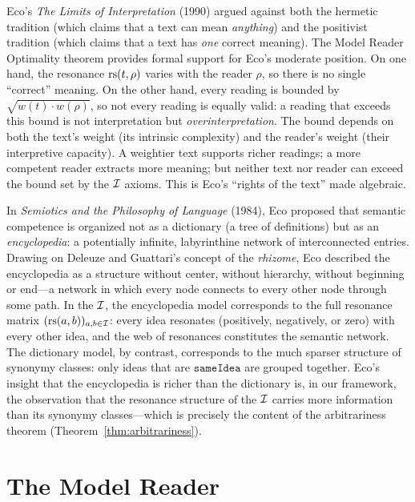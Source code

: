 \begin{interpretation}
Eco's \textit{The Limits of Interpretation} (1990) argued against both the hermetic tradition (which claims that a text can mean \emph{anything}) and the positivist tradition (which claims that a text has \emph{one} correct meaning). The Model Reader Optimality theorem provides formal support for Eco's moderate position. On one hand, the resonance $\mathrm{rs}(t, \rho)$ varies with the reader $\rho$, so there is no single ``correct'' meaning. On the other hand, every reading is bounded by $\sqrt{w(t) \cdot w(\rho)}$, so not every reading is equally valid: a reading that exceeds this bound is not interpretation but \emph{overinterpretation}. The bound depends on both the text's weight (its intrinsic complexity) and the reader's weight (their interpretive capacity). A weightier text supports richer readings; a more competent reader extracts more meaning; but neither text nor reader can exceed the bound set by the $\mathcal{I}$ axioms. This is Eco's ``rights of the text'' made algebraic.
\end{interpretation}

\begin{remark}
In \textit{Semiotics and the Philosophy of Language} (1984), Eco proposed that semantic competence is organized not as a dictionary (a tree of definitions) but as an \emph{encyclopedia}: a potentially infinite, labyrinthine network of interconnected entries. Drawing on Deleuze and Guattari's concept of the \emph{rhizome}, Eco described the encyclopedia as a structure without center, without hierarchy, without beginning or end---a network in which every node connects to every other node through some path. In the $\mathcal{I}$, the encyclopedia model corresponds to the full resonance matrix $(\mathrm{rs}(a, b))_{a, b \in \mathcal{I}}$: every idea resonates (positively, negatively, or zero) with every other idea, and the web of resonances constitutes the semantic network. The dictionary model, by contrast, corresponds to the much sparser structure of synonymy classes: only ideas that are $\texttt{sameIdea}$ are grouped together. Eco's insight that the encyclopedia is richer than the dictionary is, in our framework, the observation that the resonance structure of the $\mathcal{I}$ carries more information than its synonymy classes---which is precisely the content of the arbitrariness theorem (Theorem~\ref{thm:arbitrariness}).
\end{remark}

\section{The Model Reader}

